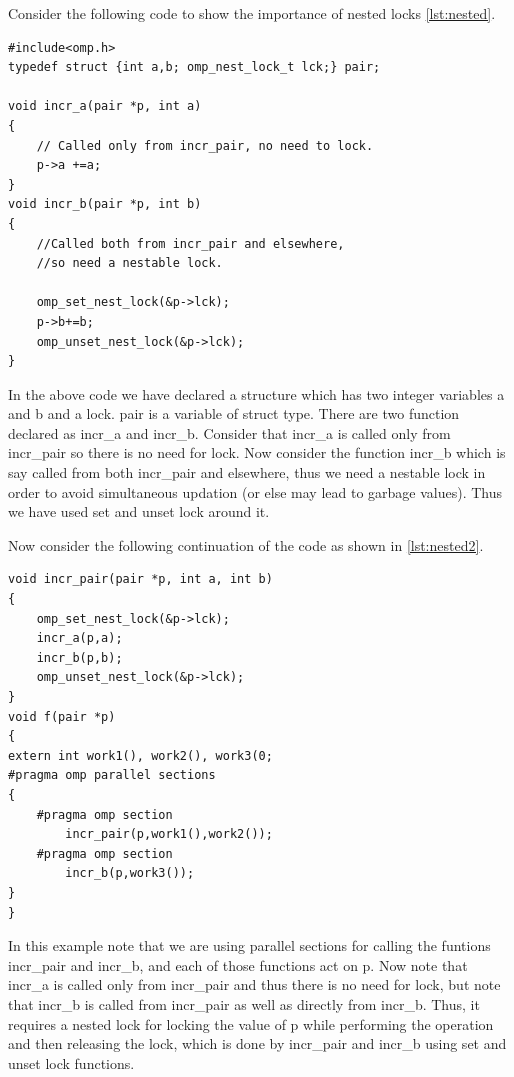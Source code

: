 \documentclass[12pt]{book}
\begin{document}
Consider the following code to show the importance of nested locks \ref{lst:nested}.
\begin{lstlisting}[caption={Nested lock-Example},captionpos=b,label={lst:nested}]
#include<omp.h>
typedef struct {int a,b; omp_nest_lock_t lck;} pair;

void incr_a(pair *p, int a)
{
    // Called only from incr_pair, no need to lock.
    p->a +=a;
}
void incr_b(pair *p, int b)
{
    //Called both from incr_pair and elsewhere,
    //so need a nestable lock.

    omp_set_nest_lock(&p->lck);
    p->b+=b;
    omp_unset_nest_lock(&p->lck);
}
\end{lstlisting}
In the above code we have declared a structure which has two integer variables a and b and a lock. pair is a variable of struct type. There are two function declared as incr\_a and incr\_b. Consider that incr\_a is called only from incr\_pair so there is no need for lock. Now consider the function incr\_b which is say called from both incr\_pair and elsewhere, thus we need a nestable lock in order to avoid simultaneous updation (or else may lead to garbage values). Thus we have used set and unset lock around it.

Now consider the following continuation of the code as shown in \ref{lst:nested2}.
\begin{lstlisting}[caption={Nest lock-Example2},captionpos=b,label={lst:nested2}]
void incr_pair(pair *p, int a, int b)
{
    omp_set_nest_lock(&p->lck);
    incr_a(p,a);
    incr_b(p,b);
    omp_unset_nest_lock(&p->lck);
}
void f(pair *p)
{
extern int work1(), work2(), work3(0;
#pragma omp parallel sections
{
    #pragma omp section
        incr_pair(p,work1(),work2());
    #pragma omp section
        incr_b(p,work3());
}
}
\end{lstlisting}
In this example note that we are using parallel sections for calling the funtions incr\_pair and incr\_b, and each of those functions act on p.  Now note that incr\_a is called only from incr\_pair and thus there is no need for lock, but note that incr\_b is called from incr\_pair as well as directly from incr\_b. Thus, it requires a nested lock for locking the value of p while performing the operation and then releasing the lock, which is done by incr\_pair and incr\_b using set and unset lock functions.
\end{document}
